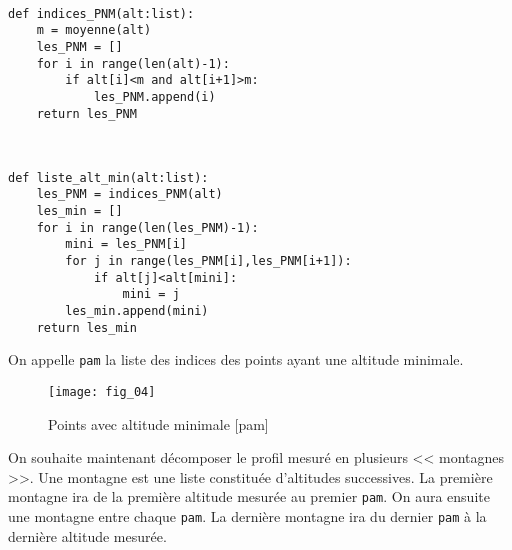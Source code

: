 
\ifprof
\begin{corrige}~\\
\vspace{-.5cm}
\begin{lstlisting}
def indices_PNM(alt:list):
    m = moyenne(alt)
    les_PNM = []
    for i in range(len(alt)-1):
        if alt[i]<m and alt[i+1]>m:
            les_PNM.append(i)
    return les_PNM
\end{lstlisting}
\end{corrige}
\else
\fi



\ifprof
\begin{corrige}~\\
\vspace{-.5cm}
\begin{lstlisting}
def liste_alt_min(alt:list):
    les_PNM = indices_PNM(alt)
    les_min = []
    for i in range(len(les_PNM)-1):
        mini = les_PNM[i]
        for j in range(les_PNM[i],les_PNM[i+1]):
            if alt[j]<alt[mini]:
                mini = j
        les_min.append(mini)
    return les_min
\end{lstlisting}
\end{corrige}
\else
\fi

\ifprof
\else
On appelle \texttt{pam} la liste des indices des points ayant une altitude minimale.

\begin{figure}[H]
\centering
\texttt{[image: fig\_04]}
\caption{Points avec altitude minimale [pam]}
\end{figure}

On souhaite maintenant décomposer le profil mesuré en plusieurs << montagnes >>. 
Une montagne est une liste constituée d'altitudes successives.
La première montagne ira de la première altitude mesurée au premier \texttt{pam}. 
On aura ensuite une montagne entre chaque \texttt{pam}. 
La dernière montagne ira du dernier \texttt{pam} à la dernière altitude mesurée.
\fi


